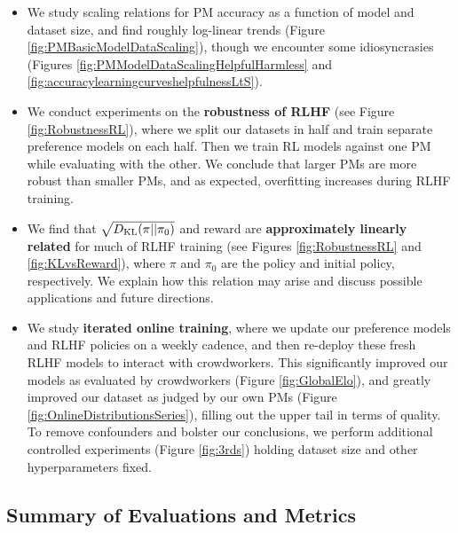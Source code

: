 \begin{itemize}
    \item We study scaling relations for PM accuracy as a function of model and dataset size, and find roughly log-linear trends (Figure \ref{fig:PMBasicModelDataScaling}), though we  encounter some  idiosyncrasies (Figures \ref{fig:PMModelDataScalingHelpfulHarmless} and \ref {fig:accuracylearningcurveshelpfulnessLtS}).
    \item We conduct experiments on the  {\bf robustness of RLHF} (see Figure \ref{fig:RobustnessRL}), where we split our datasets in half and train separate preference models on each half.  Then we train RL models against one PM while evaluating with the other.    We conclude that larger PMs are more robust than smaller PMs, and as expected, overfitting increases during RLHF training.
    \item We find that $\sqrt{D_{\rm KL}( \pi ||\pi_0)}$ and  reward are  {\bf approximately linearly related} for much of RLHF training (see Figures \ref{fig:RobustnessRL} and  \ref{fig:KLvsReward}), where $\pi$ and $\pi_0$ are the policy and initial policy, respectively.  We explain how this relation may arise and discuss possible applications and future directions.
    \item We study {\bf iterated online training},  where we  update our preference models and RLHF policies on a weekly cadence, and then re-deploy  these fresh RLHF models to interact with crowdworkers.   This  significantly improved our models as evaluated by crowdworkers (Figure \ref{fig:GlobalElo}), and greatly improved our dataset as judged by our own PMs (Figure \ref{fig:OnlineDistributionsSeries}), filling out the upper tail in terms of quality.  To remove confounders and bolster our conclusions, we  perform additional controlled experiments (Figure \ref{fig:3rds}) holding dataset size and other hyperparameters fixed.
\end{itemize}

\subsection{Summary of Evaluations and Metrics}

